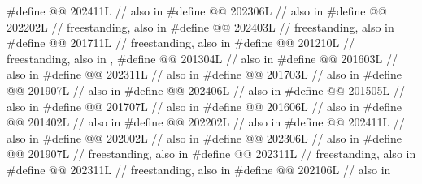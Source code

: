 \begin{codeblock}
#define @@             202411L // also in 
#define @@                               202306L // also in 
#define @@          202202L // freestanding, also in 
#define @@                 202403L // freestanding, also in 
#define @@                      201711L // freestanding, also in 
#define @@                  201210L
  // freestanding, also in , 
#define @@       201304L // also in 
#define @@                            201603L // also in 
#define @@             202311L // also in 
#define @@                       201703L // also in 
#define @@                         201907L // also in 
#define @@                           202406L // also in 
#define @@                      201505L // also in 
#define @@                 201707L // also in 
#define @@              201606L // also in 
#define @@                201402L // also in 
#define @@                             202202L // also in 
#define @@                              202411L // also in 
#define @@           202002L // also in 
#define @@          202306L // also in 
#define @@                   201907L // freestanding, also in 
#define @@                              202311L // freestanding, also in 
#define @@             202311L // freestanding, also in 
#define @@                        202106L // also in 

\end{codeblock}
